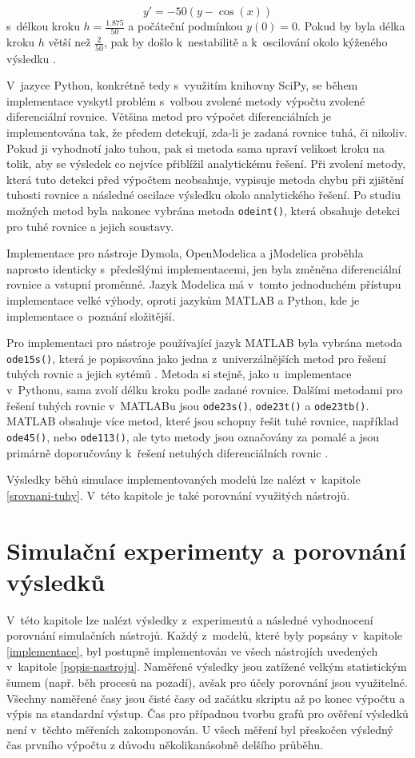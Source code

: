\begin{equation}
    y' = -50(y - \cos{(x)})
\end{equation}
s~délkou kroku $h = \frac{1.875}{50}$ a počáteční podmínkou $y(0) = 0$. Pokud by byla délka kroku $h$ větší než $\frac{2}{50}$, pak by došlo k~nestabilitě a k~oscilování okolo kýženého výsledku \cite{hairer}.

V~jazyce Python, konkrétně tedy s~využitím knihovny SciPy, se během implementace vyskytl problém s~volbou zvolené metody výpočtu zvolené diferenciální rovnice. Většina metod pro výpočet diferenciálních je implementována tak, že předem detekují, zda-li je zadaná rovnice tuhá, či nikoliv. Pokud ji vyhodnotí jako tuhou, pak si metoda sama upraví velikost kroku na tolik, aby se výsledek co nejvíce přiblížil analytickému řešení. Při zvolení metody, která tuto detekci před výpočtem neobsahuje, vypisuje metoda chybu při zjištění tuhosti rovnice a následné oscilace výsledku okolo analytického řešení. Po studiu možných metod byla nakonec vybrána metoda \texttt{odeint()}, která obsahuje detekci pro tuhé rovnice a jejich soustavy.

Implementace pro nástroje Dymola, OpenModelica a jModelica proběhla naprosto identicky s~předešlými implementacemi, jen byla změněna diferenciální rovnice a vstupní proměnné. Jazyk Modelica má v~tomto jednoduchém přístupu implementace velké výhody, oproti jazykům MATLAB a Python, kde je implementace o~poznání složitější.

Pro implementaci pro nástroje používající jazyk MATLAB byla vybrána metoda \texttt{ode15s()}, která je popisována jako jedna z~univerzálnějších metod pro řešení tuhých rovnic a jejich sytémů \cite{MATLAB:2010}. Metoda si stejně, jako u~implementace v~Pythonu, sama zvolí délku kroku podle zadané rovnice. Dalšími metodami pro řešení tuhých rovnic v~MATLABu jsou \texttt{ode23s()}, \texttt{ode23t()} a \texttt{ode23tb()}. MATLAB obsahuje více metod, které jsou schopny řešit tuhé rovnice, například \texttt{ode45()}, nebo \texttt{ode113()}, ale tyto metody jsou označovány za pomalé a jsou primárně doporučovány k~řešení netuhých diferenciálních rovnic \cite{MATLAB:2010}.

Výsledky běhů simulace implementovaných modelů lze nalézt v~kapitole \ref{srovnani-tuhy}. V~této kapitole je také porovnání využitých nástrojů.

\chapter{Simulační experimenty a porovnání výsledků}
\label{kapitola5}
V~této kapitole lze nalézt výsledky z~experimentů a následné vyhodnocení porovnání simulačních nástrojů. Každý z~modelů, které byly popsány v~kapitole \ref{implementace}, byl postupně implementován ve všech nástrojích uvedených v~kapitole \ref{popis-nastroju}. Naměřené výsledky jsou zatížené velkým statistickým šumem (např. běh procesů na pozadí), avšak pro účely porovnání jsou využitelné. Všechny naměřené časy jsou čisté časy od začátku skriptu až po konec výpočtu a výpis na standardní výstup. Čas pro případnou tvorbu grafů pro ověření výsledků není v~těchto měřeních zakomponován. U všech měření byl přeskočen výsledný čas prvního výpočtu z důvodu několikanásobně delšího průběhu. 

